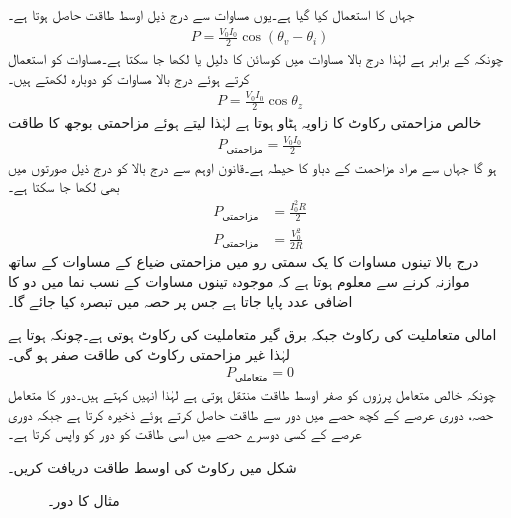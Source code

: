 جہاں  کا استعمال کیا گیا ہے۔یوں مساوات  سے درج ذیل اوسط طاقت حاصل  ہوتا ہے۔
\begin{align}\label{مساوات_طاقت_عمومی_الف}
P=\frac{V_0 I_0}{2}\cos(\theta_v-\theta_i)
\end{align}
چونکہ  کے برابر ہے لہٰذا درج بالا مساوات میں کوسائن کا دلیل  یا  لکھا جا سکتا ہے۔مساوات  کو استعمال کرتے ہوئے درج بالا مساوات کو دوبارہ لکھتے ہیں۔
\begin{align}\label{مساوات_طاقت_عمومی_ب}
P=\frac{V_0 I_0}{2}\cos \theta_z
\end{align}
خالص مزاحمتی رکاوٹ  کا زاویہ ہٹاو  ہوتا ہے لہٰذا  لیتے ہوئے مزاحمتی بوجھ کا طاقت
\begin{align}\label{مساوات_طاقت_مزاحمتی_طاقت_الف}
P_{\text{مزاحمتی}}=\frac{V_0 I_0}{2}
\end{align}
ہو گا جہاں  سے مراد مزاحمت کے دباو کا حیطہ ہے۔قانون اوہم سے درج بالا کو درج ذیل صورتوں میں بھی لکھا جا سکتا ہے۔
\begin{align}
P_{\text{مزاحمتی}}&=\frac{I^2_0 R}{2} \label{مساوات_طاقت_مزاحمتی_طاقت_ب}\\
P_{\text{مزاحمتی}}&=\frac{V^2_0}{2 R} \label{مساوات_طاقت_مزاحمتی_طاقت_پ}
\end{align}
درج بالا تینوں مساوات کا یک سمتی رو میں مزاحمتی ضیاع کے مساوات کے ساتھ موازنہ کرنے سے معلوم ہوتا ہے کہ موجودہ تینوں مساوات کے نسب نما میں دو  کا اضافی عدد پایا جاتا ہے جس پر حصہ  میں  تبصرہ کیا جائے گا۔

امالی متعاملیت کی رکاوٹ  جبکہ برق گیر متعاملیت کی رکاوٹ  ہوتی ہے۔چونکہ  ہوتا ہے لہٰذا غیر مزاحمتی رکاوٹ کی طاقت صفر ہو گی۔
\begin{align}
P_{\text{متعاملی}} =0
\end{align}
چونکہ خالص متعامل پرزوں کو صفر اوسط طاقت منتقل ہوتی ہے لہٰذا انہیں  کہتے ہیں۔دور کا متعامل حصہ، دوری عرصے کے کچھ حصے میں  دور سے طاقت حاصل کرتے ہوئے  ذخیرہ کرتا ہے  جبکہ دوری عرصے کے کسی دوسرے حصے میں اسی طاقت کو دور کو واپس کرتا ہے۔

شکل  میں رکاوٹ کی اوسط طاقت دریافت کریں۔
\begin{figure}
\centering
{}
\caption{مثال  کا دور۔}
\label{مشق_طاقت_مزاحمت_امالہ_الف}
\end{figure}

